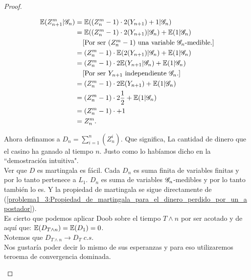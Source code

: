 \begin{proof}
\begin{enumerate}
			\begin{align}\label{problema1_3:Propiedad_de_martingala_para_el_dinero_perdido_por_un_apostador}
				\mathbb{E}(Z_{n+1}^{m} | \mathscr{G}_n) &= \mathbb{E}((Z_n^{m} - 1) \cdot 2(Y_{n+1}) + 1 | \mathscr{G}_n)\\
				                       &= \mathbb{E}((Z_n^{m} -1) \cdot 2(Y_{n+1}) | \mathscr{G}_n) + \mathbb{E}( 1 | \mathscr{G}_n)\\
				                       &\;\;\;\;\mbox{[Por ser $(Z_n^{m} - 1)$ una variable $\mathscr{G}_n$-medible.]}\\
				                       &= (Z_n^{m} -1) \cdot \mathbb{E}(  2(Y_{n+1}) | \mathscr{G}_n) + \mathbb{E}( 1 | \mathscr{G}_n)\\
				                       &= (Z_n^{m} -1) \cdot 2\mathbb{E}( Y_{n+1} | \mathscr{G}_n) + \mathbb{E}( 1 | \mathscr{G}_n)\\
				                       &\;\;\;\;\mbox{[Por ser $Y_{n + 1}$ independiente $\mathscr{G}_n$.]}\\
				                       &= (Z_n^{m} -1) \cdot 2\mathbb{E}( Y_{n+1}) + \mathbb{E}( 1 | \mathscr{G}_n)\\
				                       &= (Z_n^{m} -1) \cdot 2 \frac{1}{2} + \mathbb{E}( 1 | \mathscr{G}_n)\\
				                       &= (Z_n^{m} -1) \cdot + 1 \\
				                       &= Z_n^m.
			\end{align}
			
			Ahora definamos a $D_n = \sum_{i=1}^n (Z_n^i)$. Que significa, La cantidad de dinero que el casino ha ganado al tiempo $n$. 
			Justo como lo habíamos dicho en la ``demostración intuitiva".\\
			
			Ver que $D$ es martingala es fácil. Cada $D_n$ es suma finita de variables finitas y por lo tanto pertenece a $L_1$.
			$D_n$ es suma de variables $\mathscr{G}_n$-medibles y por lo tanto también lo es. Y la propiedad de martingala se sigue directamente de
			(\ref{problema1_3:Propiedad_de_martingala_para_el_dinero_perdido_por_un_apostador}).\\
			
		    Es cierto que podemos aplicar Doob sobre el tiempo $T \wedge n$ por ser acotado y de aquí que:
		    $\mathbb{E}(D_{T \wedge n}) = \mathbb{E}(D_1) = 0$.\\
		    
		    Notemos que $D_{T \wedge n} \longrightarrow D_T \; c.s.$\\
		    
		    Nos gustaría poder decir lo mismo de sus esperanzas y para eso utilizaremos teroema de convergencia dominada.\\
		    

\end{enumerate}
\end{proof}

